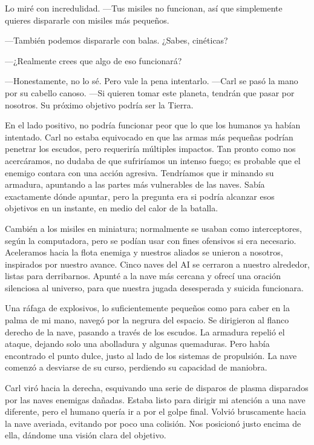 \documentclass[spanish,12pt,a4paper,oneside,titlepage]{book}
\begin{document}
    Lo miré con incredulidad. —Tus misiles no funcionan, así que simplemente quieres dispararle con misiles más pequeños.

    —También podemos dispararle con balas. ¿Sabes, cinéticas?

    —¿Realmente crees que algo de eso funcionará?

    —Honestamente, no lo sé. Pero vale la pena intentarlo. —Carl se pasó la mano por su cabello canoso. —Si quieren tomar este planeta, tendrán que pasar por nosotros. Su próximo objetivo podría ser la Tierra.

    En el lado positivo, no podría funcionar peor que lo que los humanos ya habían intentado. Carl no estaba equivocado en que las armas más pequeñas podrían penetrar los escudos, pero requeriría múltiples impactos. Tan pronto como nos acercáramos, no dudaba de que sufriríamos un intenso fuego; es probable que el enemigo contara con una acción agresiva. Tendríamos que ir minando su armadura, apuntando a las partes más vulnerables de las naves. Sabía exactamente dónde apuntar, pero la pregunta era si podría alcanzar esos objetivos en un instante, en medio del calor de la batalla.

    Cambién a los misiles en miniatura; normalmente se usaban como interceptores, según la computadora, pero se podían usar con fines ofensivos si era necesario. Aceleramos hacia la flota enemiga y nuestros aliados se unieron a nosotros, inspirados por nuestro avance. Cinco naves del AI se cerraron a nuestro alrededor, listas para derribarnos. Apunté a la nave más cercana y ofrecí una oración silenciosa al universo, para que nuestra jugada desesperada y suicida funcionara.

    Una ráfaga de explosivos, lo suficientemente pequeños como para caber en la palma de mi mano, navegó por la negrura del espacio. Se dirigieron al flanco derecho de la nave, pasando a través de los escudos. La armadura repelió el ataque, dejando solo una abolladura y algunas quemaduras. Pero había encontrado el punto dulce, justo al lado de los sistemas de propulsión. La nave comenzó a desviarse de su curso, perdiendo su capacidad de maniobra.

    Carl viró hacia la derecha, esquivando una serie de disparos de plasma disparados por las naves enemigas dañadas. Estaba listo para dirigir mi atención a una nave diferente, pero el humano quería ir a por el golpe final. Volvió bruscamente hacia la nave averiada, evitando por poco una colisión. Nos posicionó justo encima de ella, dándome una visión clara del objetivo.
\end{document}
